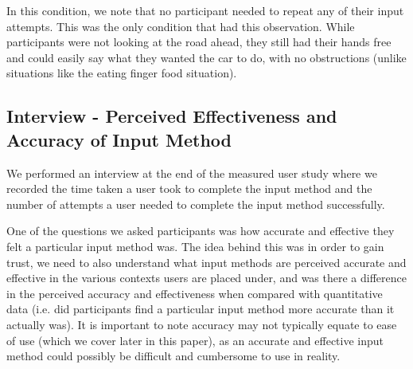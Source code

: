 \documentclass{sigchi}
\begin{document}
\begin{table}[H] %
\centering
\caption{Number of attempts by each participant for each input method, when eating finger food when a request to intervene was issued}
\label{table:attemptsOutdoors}
\end{table}

In this condition, we note that no participant needed to repeat any of their input attempts. This was the only condition that had this observation. While participants were not looking at the road ahead, they still had their hands free and could easily say what they wanted the car to do, with no obstructions (unlike situations like the eating finger food situation).

\subsection{Interview - Perceived Effectiveness and Accuracy of Input Method}

We performed an interview at the end of the measured user study where we recorded the time taken a user took to complete the input method and the number of attempts a user needed to complete the input method successfully. 

One of the questions we asked participants was how accurate and effective they felt a particular input method was. The idea behind this was in order to gain trust, we need to also understand what input methods are perceived accurate and effective in the various contexts users are placed under, and was there a difference in the perceived accuracy and effectiveness when compared with quantitative data (i.e. did participants find a particular input method more accurate than it actually was). It is important to note accuracy may not typically equate to ease of use (which we cover later in this paper), as an accurate and effective input method could possibly be difficult and cumbersome to use in reality.
\end{document}

